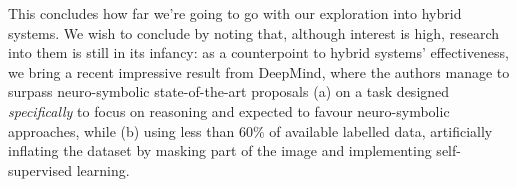\documentclass[../main.tex]{subfiles}
\begin{document}
This concludes how far we're going to go with our exploration into hybrid systems. We wish to conclude by noting that, although interest is high, research into them is still in its infancy: as a counterpoint to hybrid systems' effectiveness, we bring a recent impressive result from DeepMind\cite{dingObjectbasedAttentionSpatiotemporal2020}, where the authors manage to surpass neuro-symbolic state-of-the-art proposals (a) on a task designed \textit{specifically} to focus on reasoning and expected to favour neuro-symbolic approaches\cite{yiCLEVRERCollisionEvents2019}, while (b) using less than 60\% of available labelled data, artificially inflating the dataset by masking part of the image and implementing self-supervised learning.
\end{document}
